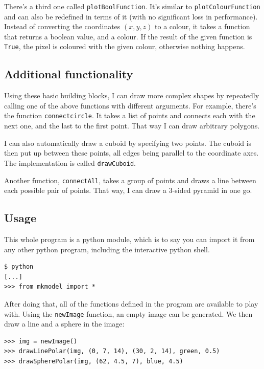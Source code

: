 \documentclass[a4paper, 11pt, titlepage]{report}
\begin{document}
There's a third one called \texttt{plotBoolFunction}. It's similar to \texttt{plotColourFunction}
and can also be redefined in terms of it (with no significant loss in performance). Instead of
converting the coordinates $(x, y, z)$ to a colour, it takes a function that returns a boolean
value, and a colour. If the result of the given function is \texttt{True}, the pixel is coloured
with the given colour, otherwise nothing happens.


\subsection{Additional functionality}

Using these basic building blocks, I can draw more complex shapes by repeatedly calling one of the
above functions with different arguments. For example, there's the function
\texttt{connectcircle}. It takes a list of points and connects each with the next one, and the
last to the first point. That way I can draw arbitrary polygons.

I can also automatically draw a cuboid by specifying two points. The cuboid is then put up between
these points, all edges being parallel to the coordinate axes. The implementation is called
\texttt{drawCuboid}.

Another function, \texttt{connectAll}, takes a group of points and draws a line between each
possible pair of points.  That way, I can draw a 3-sided pyramid in one go.

\subsection{Usage}

This whole program is a python module, which is to say you can import it from any other python
program, including the interactive python shell.

\begin{lstlisting}
$ python
[...]
>>> from mkmodel import *
\end{lstlisting}
\vspace{-2mm}

After doing that, all of the functions defined in the program are available to play with. Using
the \texttt{newImage} function, an empty image can be generated. We then draw a line and a sphere
in the image:

\begin{lstlisting}
>>> img = newImage()
>>> drawLinePolar(img, (0, 7, 14), (30, 2, 14), green, 0.5)
>>> drawSpherePolar(img, (62, 4.5, 7), blue, 4.5)
\end{lstlisting}
\vspace{-2mm}
\end{document}
